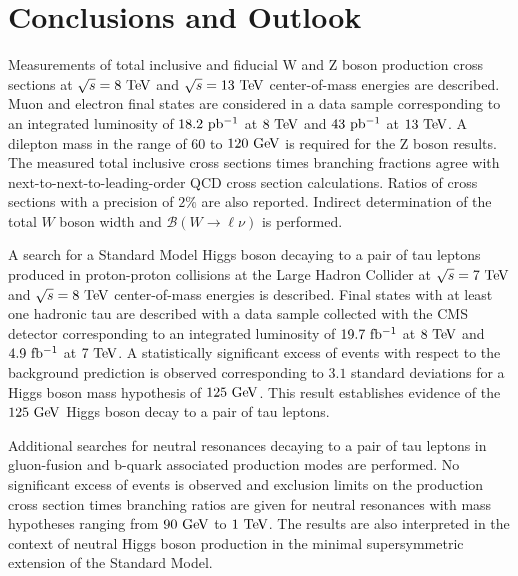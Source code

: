 \chapter{Conclusions and Outlook}

Measurements of total inclusive and fiducial W and Z boson production cross sections at $\sqrt{s}=8~\mathrm{Te\kern -0.1em V}$  and $\sqrt{s}=13~\mathrm{Te\kern -0.1em V}$ center-of-mass energies are described. Muon and electron final states are considered in a data sample corresponding to an integrated luminosity of $18.2~\mathrm{pb^{-1}}$ at $8~\mathrm{Te\kern -0.1em V}$ and $43~\mathrm{pb^{-1}}$ at $13~\mathrm{Te\kern -0.1em V}$. A dilepton mass in the range of $60$ to $120~\mathrm{Ge\kern -0.1em V}$ is required for the Z boson results. The measured total inclusive cross sections times branching fractions agree with next-to-next-to-leading-order QCD cross section calculations. Ratios of cross sections with a precision of $2\%$ are also reported. Indirect determination of the total $W$ boson width and $\mathcal{B}(W\rightarrow\ell\nu)$ is performed.

A search for a Standard Model Higgs boson decaying to a pair of tau leptons produced in proton-proton collisions at the Large Hadron Collider at $\sqrt{s}=7~\mathrm{Te\kern -0.1em V}$ and $\sqrt{s}=8~\mathrm{Te\kern -0.1em V}$ center-of-mass energies is described. Final states with at least one hadronic tau are described with a data sample collected with the CMS detector corresponding to an integrated luminosity of $19.7~\mathrm{fb^{-1}}$ at $8~\mathrm{Te\kern -0.1em V}$ and $4.9~\mathrm{fb^{-1}}$ at $7~\mathrm{Te\kern -0.1em V}$. A statistically significant excess of events with respect to the background prediction is observed corresponding to $3.1$ standard deviations for a Higgs boson mass hypothesis of $125~\mathrm{Ge\kern -0.1em V}$. This result establishes evidence of the $125~\mathrm{Ge\kern -0.1em V}$ Higgs boson decay to a pair of tau leptons. 

Additional searches for neutral resonances decaying to a pair of tau leptons in gluon-fusion and b-quark associated production modes are performed. No significant excess of events is observed and exclusion limits on the production cross section times branching ratios are given for neutral resonances with mass hypotheses ranging from $90~\mathrm{Ge\kern -0.1em V}$ to $1~\mathrm{Te\kern -0.1em V}$. The results are also interpreted in the context of neutral Higgs boson production in the minimal supersymmetric extension of the Standard Model. 

